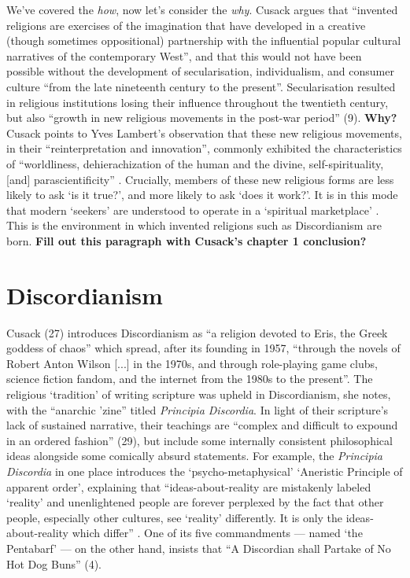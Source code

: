 \documentclass[Draft.tex]{subfiles}
\begin{document}
We've covered the \textit{how}, now let's consider the \textit{why}.
Cusack \parencite*[7]{Cusack10} argues that ``invented religions are
exercises of the imagination that have developed in a creative
(though sometimes oppositional) partnership with the influential
popular cultural narratives of the contemporary West'',
and that this would not have been possible without
the development of secularisation, individualism, and consumer culture
``from the late nineteenth century to the present''.
Secularisation resulted in religious institutions losing their influence
throughout the twentieth century, but also
``growth in new religious movements in the post-war period'' (9).
\textbf{Why?}
Cusack \parencite[9]{Cusack10} points to Yves Lambert's observation that
these new religious movements, in their ``reinterpretation and innovation'',
commonly exhibited the characteristics of
``worldliness, dehierachization of the human and the divine,
self-spirituality, [and] parascientificity'' \parencite[303]{Lambert99}.
Crucially, members of these new religious forms are less likely to ask
`is it true?', and more likely to ask `does it work?'.
It is in this mode that modern `seekers' are understood to operate in
a `spiritual marketplace' \parencite[13]{Cusack10}.
This is the environment in which invented religions
such as Discordianism are born.
\textbf{Fill out this paragraph with Cusack's chapter 1 conclusion?}

\section*{Discordianism}
Cusack (27) introduces Discordianism as
``a religion devoted to Eris, the Greek goddess of chaos''
which spread, after its founding in 1957, ``through
the novels of Robert Anton Wilson [...] in the 1970s,
and through role-playing game clubs, science fiction fandom,
and the internet from the 1980s to the present''.
The religious `tradition' of writing scripture was upheld in Discordianism,
she notes, with the ``anarchic 'zine'' titled \textit{Principia Discordia}.
In light of their scripture's lack of sustained narrative, their teachings
are ``complex and difficult to expound in an ordered fashion'' (29),
but include some internally consistent philosophical ideas
alongside some comically absurd statements.
For example, the \textit{Principia Discordia} in one place introduces the
`psycho-metaphysical' `Aneristic Principle of apparent order',
explaining that ``ideas-about-reality are mistakenly labeled `reality'
and unenlightened people are forever perplexed by the fact that
other people, especially other cultures, see `reality' differently.
It is only the ideas-about-reality which differ'' \parencite[49]{Principia}.
One of its five commandments --- named `the Pentabarf' --- on the other hand,
insists that ``A Discordian shall Partake of No Hot Dog Buns'' (4).
\end{document}
